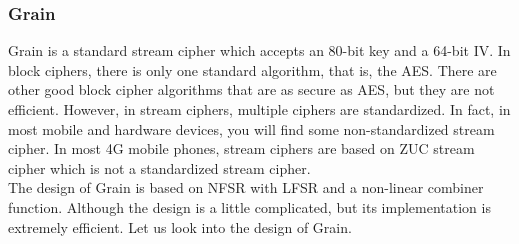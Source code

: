\documentclass[11pt]{article}
\begin{document}
\subsubsection{Grain}
Grain is a standard stream cipher which accepts an 80-bit key and a 64-bit IV. In block ciphers, there is only one standard algorithm, that is, the AES. There are other good block cipher algorithms that are as secure as AES, but they are not efficient. However, in stream ciphers, multiple ciphers are standardized. In fact, in most mobile and hardware devices, you will find some non-standardized stream cipher. In most 4G mobile phones, stream ciphers are based on ZUC stream cipher which is not a standardized stream cipher.\\
\newline
The design of Grain is based on NFSR with LFSR and a non-linear combiner function. Although the design is a little complicated, but its implementation is extremely efficient. Let us look into the design of Grain.
\end{document}

